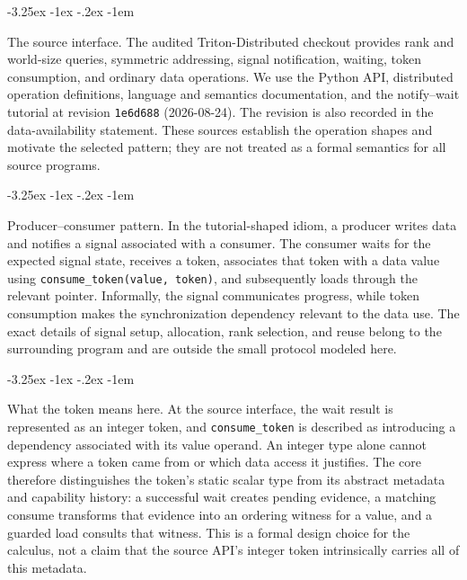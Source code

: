 \documentclass[a4paper,USenglish]{lipics-v2021}
\makeatletter
\renewcommand\paragraph{\@startsection{paragraph}{4}{\z@}%
  {-3.25ex \@plus -1ex \@minus -.2ex}%
  {-1em}%
  {\sffamily\large\bfseries\raggedright}}
\makeatother
\begin{document}
\paragraph{The source interface.} The audited Triton-Distributed checkout provides rank and world-size queries, symmetric addressing, signal notification, waiting, token consumption, and ordinary data operations. We use the Python API, distributed operation definitions, language and semantics documentation, and the notify--wait tutorial at revision \texttt{1e6d688} (2026-08-24). The revision is also recorded in the data-availability statement. These sources establish the operation shapes and motivate the selected pattern; they are not treated as a formal semantics for all source programs.

\paragraph{Producer--consumer pattern.} In the tutorial-shaped idiom, a producer writes data and notifies a signal associated with a consumer. The consumer waits for the expected signal state, receives a token, associates that token with a data value using \texttt{consume\_token(value, token)}, and subsequently loads through the relevant pointer. Informally, the signal communicates progress, while token consumption makes the synchronization dependency relevant to the data use. The exact details of signal setup, allocation, rank selection, and reuse belong to the surrounding program and are outside the small protocol modeled here.

\paragraph{What the token means here.} At the source interface, the wait result is represented as an integer token, and \texttt{consume\_token} is described as introducing a dependency associated with its value operand. An integer type alone cannot express where a token came from or which data access it justifies. The core therefore distinguishes the token's static scalar type from its abstract metadata and capability history: a successful wait creates pending evidence, a matching consume transforms that evidence into an ordering witness for a value, and a guarded load consults that witness. This is a formal design choice for the calculus, not a claim that the source API's integer token intrinsically carries all of this metadata.
\end{document}
